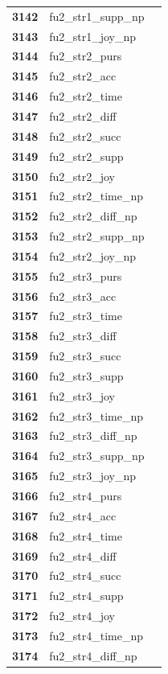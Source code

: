 \documentclass[
  letterpaper,
  DIV=11,
  numbers=noendperiod]{scrartcl}
\begin{document}
\begin{longtable}[t]{>{}cll}
\textbf{3142} & fu2\_str1\_supp\_np & \\
\textbf{3143} & fu2\_str1\_joy\_np & \\
\textbf{3144} & fu2\_str2\_purs & \\
\textbf{3145} & fu2\_str2\_acc & \\
\addlinespace
\textbf{3146} & fu2\_str2\_time & \\
\textbf{3147} & fu2\_str2\_diff & \\
\textbf{3148} & fu2\_str2\_succ & \\
\textbf{3149} & fu2\_str2\_supp & \\
\textbf{3150} & fu2\_str2\_joy & \\
\addlinespace
\textbf{3151} & fu2\_str2\_time\_np & \\
\textbf{3152} & fu2\_str2\_diff\_np & \\
\textbf{3153} & fu2\_str2\_supp\_np & \\
\textbf{3154} & fu2\_str2\_joy\_np & \\
\textbf{3155} & fu2\_str3\_purs & \\
\addlinespace
\textbf{3156} & fu2\_str3\_acc & \\
\textbf{3157} & fu2\_str3\_time & \\
\textbf{3158} & fu2\_str3\_diff & \\
\textbf{3159} & fu2\_str3\_succ & \\
\textbf{3160} & fu2\_str3\_supp & \\
\addlinespace
\textbf{3161} & fu2\_str3\_joy & \\
\textbf{3162} & fu2\_str3\_time\_np & \\
\textbf{3163} & fu2\_str3\_diff\_np & \\
\textbf{3164} & fu2\_str3\_supp\_np & \\
\textbf{3165} & fu2\_str3\_joy\_np & \\
\addlinespace
\textbf{3166} & fu2\_str4\_purs & \\
\textbf{3167} & fu2\_str4\_acc & \\
\textbf{3168} & fu2\_str4\_time & \\
\textbf{3169} & fu2\_str4\_diff & \\
\textbf{3170} & fu2\_str4\_succ & \\
\addlinespace
\textbf{3171} & fu2\_str4\_supp & \\
\textbf{3172} & fu2\_str4\_joy & \\
\textbf{3173} & fu2\_str4\_time\_np & \\
\textbf{3174} & fu2\_str4\_diff\_np & \\

\end{longtable}
\end{document}
